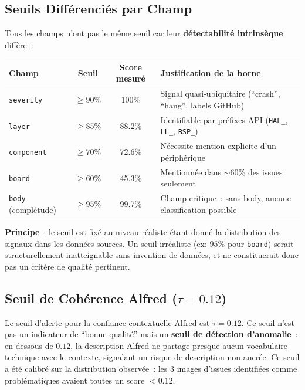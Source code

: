 \subsection{Seuils Différenciés par Champ}

Tous les champs n'ont pas le même seuil car leur \textbf{détectabilité intrinsèque} diffère~:

\begin{longtable}{p{3cm}ccp{6cm}}
\toprule
\textbf{Champ} & \textbf{Seuil} & \textbf{Score mesuré} & \textbf{Justification de la borne} \\
\midrule
\texttt{severity} & $\geq 90\%$ & 100\% & Signal quasi-ubiquitaire (``crash'', ``hang'', labels GitHub) \\
\texttt{layer} & $\geq 85\%$ & 88.2\% & Identifiable par préfixes API (\texttt{HAL\_}, \texttt{LL\_}, \texttt{BSP\_}) \\
\texttt{component} & $\geq 70\%$ & 72.6\% & Nécessite mention explicite d'un périphérique \\
\texttt{board} & $\geq 60\%$ & 45.3\% & Mentionnée dans $\sim$60\% des issues seulement \\
\texttt{body} (complétude) & $\geq 95\%$ & 99.7\% & Champ critique~: sans body, aucune classification possible \\
\bottomrule
\end{longtable}

\textbf{Principe}~: le seuil est fixé au niveau réaliste étant donné la distribution des signaux dans les données sources. Un seuil irréaliste (ex: $95\%$ pour \texttt{board}) serait structurellement inatteignable sans invention de données, et ne constituerait donc pas un critère de qualité pertinent.

\subsection{Seuil de Cohérence Alfred ($\tau = 0.12$)}

Le seuil d'alerte pour la confiance contextuelle Alfred est $\tau = 0.12$. Ce seuil n'est pas un indicateur de ``bonne qualité'' mais un \textbf{seuil de détection d'anomalie}~: en dessous de $0.12$, la description Alfred ne partage presque aucun vocabulaire technique avec le contexte, signalant un risque de description non ancrée. Ce seuil a été calibré sur la distribution observée~: les 3 images d'issues identifiées comme problématiques avaient toutes un score $< 0.12$.

